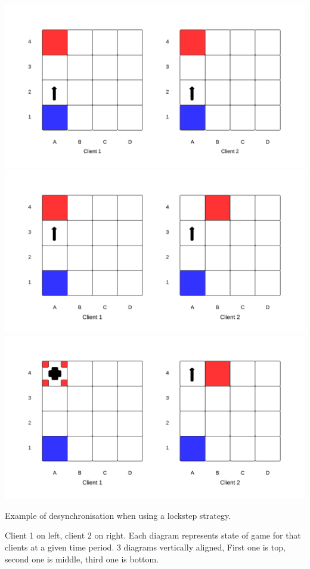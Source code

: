 \begin{marginfigure}
	\includegraphics{res/computer_communication_architecture/ServerClientDesynchronisation1.pdf}
	\includegraphics{res/computer_communication_architecture/ServerClientDesynchronisation2.pdf}
	\includegraphics{res/computer_communication_architecture/ServerClientDesynchronisation3.pdf}		
	\caption[Desynchronisation when using lockstep]{Example of desynchronisation when using a lockstep strategy.} Client 1 on left, client 2 on right. 
	Each diagram represents state of game for that clients at a given time period.	3 diagrams vertically aligned, First one is top, second one is middle, third one is bottom.
	\label{fig:serverClientDesync}
\end{marginfigure}

